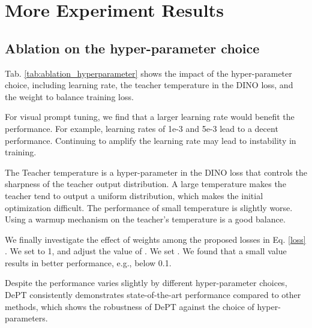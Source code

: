 \documentclass{article} \usepackage{iclr2023_conference,times}
\begin{document}
\section{More Experiment Results}


\subsection{Ablation on the hyper-parameter choice}

Tab. \ref{tab:ablation_hyperparameter} shows the impact of the hyper-parameter choice, including learning rate, the teacher temperature in the DINO loss, and the weight to balance training loss. 

For visual prompt tuning, we find that a larger learning rate would benefit the performance. For example, learning rates of 1e-3 and 5e-3 lead to a decent performance. Continuing to amplify the learning rate may lead to instability in training.

The Teacher temperature is a hyper-parameter in the DINO loss that controls the sharpness of the teacher output distribution. A large temperature makes the teacher tend to output a uniform distribution, which makes the initial optimization difficult. The performance of small temperature is slightly worse. Using a warmup mechanism on the teacher's temperature is a good balance.

We finally investigate the effect of weights among the proposed losses in Eq. \ref{loss} . We set  to 1, and adjust the value of . We set . We found that a small  value results in better performance, e.g., below 0.1.

Despite the performance varies slightly by different hyper-parameter choices, DePT consistently demonstrates state-of-the-art performance compared to other methods, which shows the robustness of DePT against the choice of hyper-parameters.

\begin{table}[h]
    \centering
    \footnotesize
\end{table}
\end{document}
